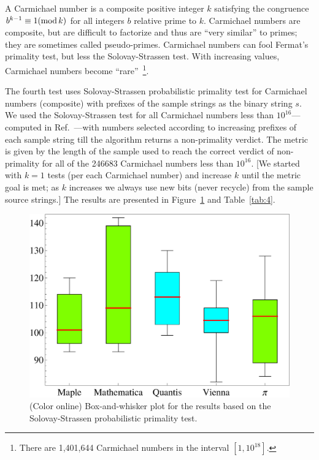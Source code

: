 \documentclass[%
 preprint,
 showpacs,
 showkeys,
 preprintnumbers,
 amsmath,amssymb,
 aps,
 prl,
  longbibliography,
 ]{revtex4-1}
\begin{document}
A Carmichael number is a composite positive integer $k$ satisfying the congruence $b^{k-1} \equiv 1 ({\rm mod } \, k)$
for all integers $b$ relative prime to $k$.
Carmichael numbers are composite, but are difficult to factorize and thus are ``very similar'' to primes;
they are sometimes called pseudo-primes.
Carmichael numbers can fool Fermat's primality test, but less   the Solovay-Strassen test.
With increasing values, Carmichael numbers
become ``rare''~\footnote{There are 1,401,644 Carmichael numbers in the interval $[1, 10^{18}]$.}.



The fourth test uses Solovay-Strassen probabilistic primality test for
Carmichael numbers (composite) with prefixes of the sample strings as the binary
string $s$. We used the Solovay-Strassen  test for all Carmichael numbers less
than $10^{16}$---computed in Ref.~\cite{Pinch,Pinch07}---with numbers selected according to increasing prefixes of each sample string till the algorithm returns
a non-primality verdict. The metric is given by the length of the sample used to
reach the correct
verdict of non-primality for all of the 246683 Carmichael numbers less than
$10^{16}$.  [We started with $k=1$ tests (per each Carmichael number) and increase $k$
until the metric goal is met; as $k$ increases we always use new bits (never
recycle) from the sample source strings.]
The results are presented in
Figure~\ref{fig:example4} and Table~\ref{tab:4}.

\begin{figure}[htbp] %
   \centering
   \includegraphics[width=6in]{2009-QvPR-boxsolovey}
   \caption{(Color online) Box-and-whisker plot for the results based on the Solovay-Strassen probabilistic primality test.}
   \label{fig:example4}
\end{figure}
\end{document}
